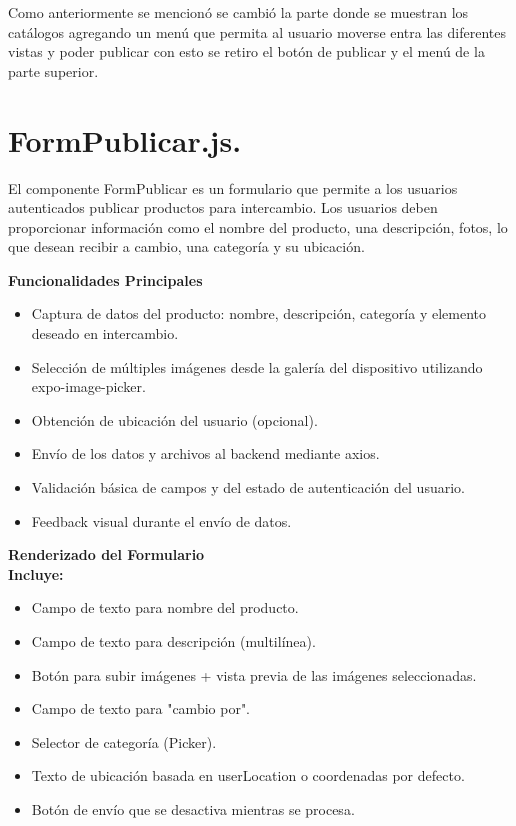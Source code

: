 \documentclass[11pt, a4paper, oneside]{book}
\begin{document}
Como anteriormente se mencionó se cambió la parte donde se muestran los catálogos agregando un menú que permita al usuario moverse entra las diferentes vistas y poder publicar con esto se retiro el botón de publicar y el menú de la parte superior.

\newpage
\section{FormPublicar.js.}
El componente FormPublicar es un formulario que permite a los usuarios autenticados publicar productos para intercambio. Los usuarios deben proporcionar información como el nombre del producto, una descripción, fotos, lo que desean recibir a cambio, una categoría y su ubicación.

\textbf {Funcionalidades Principales}
\begin{itemize}
\item Captura de datos del producto: nombre, descripción, categoría y elemento deseado en intercambio.
\item Selección de múltiples imágenes desde la galería del dispositivo utilizando expo-image-picker.
\item Obtención de ubicación del usuario (opcional).
\item Envío de los datos y archivos al backend mediante axios.
\item Validación básica de campos y del estado de autenticación del usuario.
\item Feedback visual durante el envío de datos.\\
\end{itemize}

\textbf {Renderizado del Formulario}\\
\textbf {Incluye:}
\begin{itemize}
\item Campo de texto para nombre del producto.
\item Campo de texto para descripción (multilínea).
\item Botón para subir imágenes + vista previa de las imágenes seleccionadas.
\item Campo de texto para "cambio por".
\item Selector de categoría (Picker).
\item Texto de ubicación basada en userLocation o coordenadas por defecto.
\item Botón de envío que se desactiva mientras se procesa.
\end{itemize}
\end{document}

